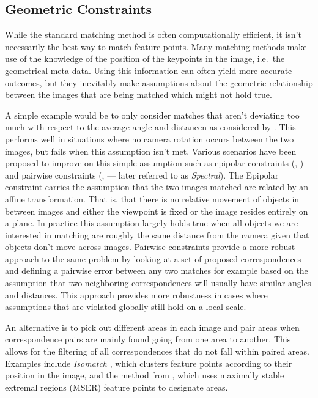 \subsection{Geometric Constraints}

While the standard matching method is often computationally efficient, 
it isn't necessarily the best way to match feature points. Many matching 
methods make use of the knowledge of the position of the keypoints in 
the image, i.e.\ the geometrical meta data. Using this information can 
often yield more accurate outcomes, but they inevitably make assumptions
about the geometric relationship between the images that are being 
matched which might not hold true.  

A simple example would be to only consider matches that aren't deviating 
too much with respect to the average angle and distancen as considered 
by \cite{kim2008efficient}.  This performs well in situations where no 
camera rotation occurs between the two images, but fails when this 
assumption isn't met. Various scenarios have been proposed to improve on 
this simple assumption such as epipolar constraints 
(\cite{torr2000mlesac}, \cite{chum2005matching}) and pairwise 
constraints (\cite{choi2009robust}, \cite{leordeanu2005spectral} --- 
later referred to as \emph{Spectral}).  The Epipolar constraint carries 
the assumption that the two images matched are related by an affine 
transformation.  That is, that there is no relative movement of objects 
in between images and either the viewpoint is fixed or the image resides 
entirely on a plane.  In practice this assumption largely holds true 
when all objects we are interested in matching are roughly the same 
distance from the camera given that objects don't move across images.  
Pairwise constraints provide a more robust approach to the same problem 
by looking at a set of proposed correspondences and defining a pairwise 
error between any two matches for example based on the assumption that 
two neighboring correspondences will usually have similar angles and 
distances. This approach provides more robustness in cases where 
assumptions that are violated globally still hold on a local scale.

An alternative is to pick out different areas in each image and pair 
areas when correspondence pairs are mainly found going from one area to 
another. This allows for the filtering of all correspondences that do 
not fall within paired areas. Examples include \emph{Isomatch} 
\cite{das2008event}, which clusters feature points according to their 
position in the image, and the method from \cite{wu2011robust}, which 
uses maximally stable extremal regions (MSER) feature points to 
designate areas. 

